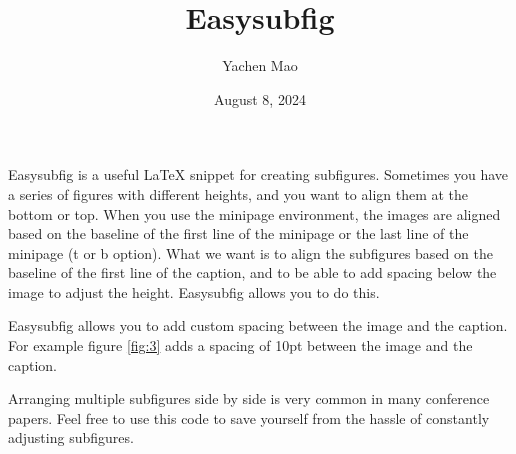 \documentclass[11pt]{article}
\title{Easysubfig}
\author{Yachen Mao}
\date{August 8, 2024}
\begin{document}
\maketitle

Easysubfig is a useful \LaTeX{} snippet for creating subfigures. Sometimes you have a series of figures with different heights, and you want to align them at the bottom or top. When you use the minipage environment, the images are aligned based on the baseline of the first line of the minipage or the last line of the minipage (t or b option). What we want is to align the subfigures based on the baseline of the first line of the caption, and to be able to add spacing below the image to adjust the height. Easysubfig allows you to do this.

Easysubfig allows you to add custom spacing between the image and the caption. For example figure \ref{fig:3} adds a spacing of 10pt between the image and the caption.

\begin{figure}[h]
\end{figure}

Arranging multiple subfigures side by side is very common in many conference papers. Feel free to use this code to save yourself from the hassle of constantly adjusting subfigures.
\end{document}
